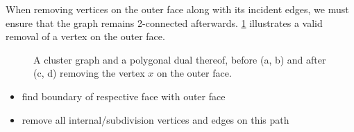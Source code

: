 When removing vertices on the outer face along with its incident edges, we must ensure that the graph remains 2-connected afterwards. \cref{fig:remove-vertex-example-external} illustrates a valid removal of a vertex on the outer face.

\begin{figure}[H]
	\centering
	\quad
	\qquad
	\quad
	\caption{A cluster graph and a polygonal dual thereof, before (a, b) and after (c, d) removing the vertex $x$ on the outer face.}
	\label{fig:remove-vertex-example-external}
\end{figure}

\begin{itemize}
	\item find boundary of respective face with outer face
	\item remove all internal/subdivision vertices and edges on this path
\end{itemize}

\lipsum
